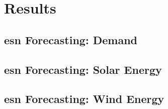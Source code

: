\section{Results}

\subsection{\gls{esn} Forecasting: Demand}


\subsection{\gls{esn} Forecasting: Solar Energy}


\subsection{\gls{esn} Forecasting: Wind Energy}


